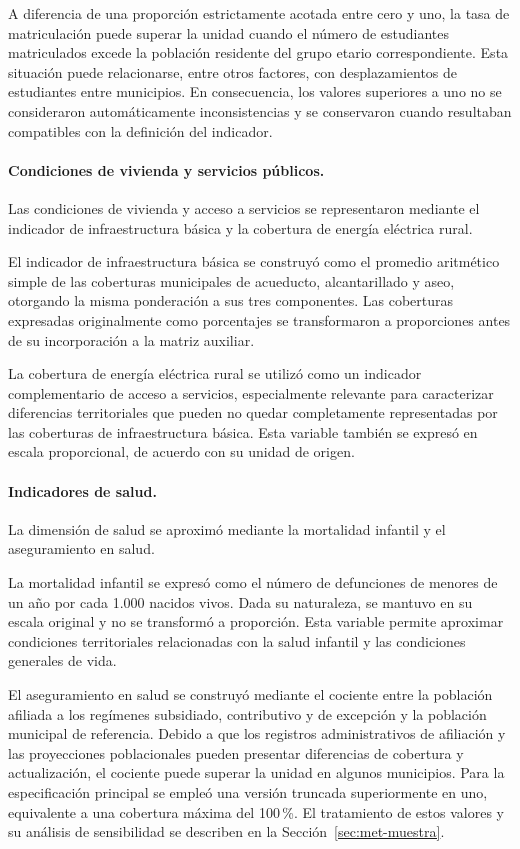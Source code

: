 A diferencia de una proporción estrictamente acotada entre cero y uno, la tasa de matriculación puede superar la unidad cuando el número de estudiantes matriculados excede la población residente del grupo etario correspondiente. Esta situación puede relacionarse, entre otros factores, con desplazamientos de estudiantes entre municipios. En consecuencia, los valores superiores a uno no se consideraron automáticamente inconsistencias y se conservaron cuando resultaban compatibles con la definición del indicador.

\paragraph{Condiciones de vivienda y servicios públicos.}

Las condiciones de vivienda y acceso a servicios se representaron mediante el indicador de infraestructura básica y la cobertura de energía eléctrica rural.

El indicador de infraestructura básica se construyó como el promedio aritmético simple de las coberturas municipales de acueducto, alcantarillado y aseo, otorgando la misma ponderación a sus tres componentes. Las coberturas expresadas originalmente como porcentajes se transformaron a proporciones antes de su incorporación a la matriz auxiliar.

La cobertura de energía eléctrica rural se utilizó como un indicador complementario de acceso a servicios, especialmente relevante para caracterizar diferencias territoriales que pueden no quedar completamente representadas por las coberturas de infraestructura básica. Esta variable también se expresó en escala proporcional, de acuerdo con su unidad de origen.

\paragraph{Indicadores de salud.}

La dimensión de salud se aproximó mediante la mortalidad infantil y el aseguramiento en salud.

La mortalidad infantil se expresó como el número de defunciones de menores de un año por cada 1.000 nacidos vivos. Dada su naturaleza, se mantuvo en su escala original y no se transformó a proporción. Esta variable permite aproximar condiciones territoriales relacionadas con la salud infantil y las condiciones generales de vida.

El aseguramiento en salud se construyó mediante el cociente entre la población afiliada a los regímenes subsidiado, contributivo y de excepción y la población municipal de referencia. Debido a que los registros administrativos de afiliación y las proyecciones poblacionales pueden presentar diferencias de cobertura y actualización, el cociente puede superar la unidad en algunos municipios. Para la especificación principal se empleó una versión truncada superiormente en uno, equivalente a una cobertura máxima del 100\,\%. El tratamiento de estos valores y su análisis de sensibilidad se describen en la Sección~\ref{sec:met-muestra}.

